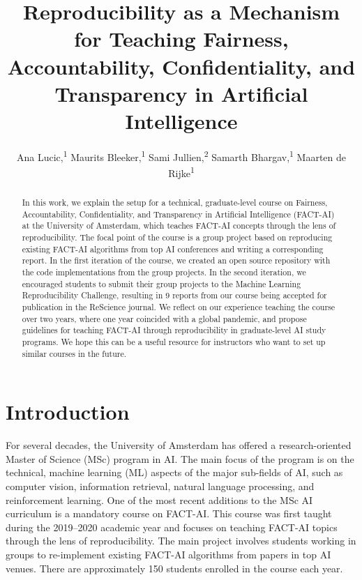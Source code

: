 \documentclass[letterpaper]{article}
\title{Reproducibility as a Mechanism for Teaching Fairness, Accountability, Confidentiality, and Transparency in Artificial Intelligence}
\author {
    Ana Lucic,\equalcontrib{}\textsuperscript{\rm 1}
    Maurits Bleeker,\equalcontrib{}\textsuperscript{\rm 1}
    Sami Jullien,\textsuperscript{\rm 2}
    Samarth Bhargav,\textsuperscript{\rm 1}
    Maarten de Rijke\textsuperscript{\rm 1}
}
\newcommand{\OurUniversity}{the University of Amsterdam}
\begin{document}
\maketitle

\begin{abstract}
In this work, we explain the setup for a technical, graduate-level course on Fairness, Accountability, Confidentiality, and Transparency in Artificial Intelligence (FACT-AI) at \OurUniversity{}, which teaches FACT-AI concepts through the lens of reproducibility. 
The focal point of the course is a group project based on reproducing existing FACT-AI algorithms from top AI conferences and writing a corresponding report. 
In the first iteration of the course, we created an open source repository with the code implementations from the group projects. 
In the second iteration, we encouraged students to submit their group projects to the Machine Learning Reproducibility Challenge, resulting in 9 reports from our course being accepted for publication in the ReScience journal. 
We reflect on our experience teaching the course over two years, where one year coincided with a global pandemic, and propose guidelines for teaching FACT-AI through reproducibility in graduate-level AI study programs. 
We hope this can be a useful resource for instructors who want to set up similar courses in the future. 
\end{abstract}





% 



\clearpage
\fi

\section{Introduction}
\label{section:introduction}

For several decades, \OurUniversity{} has offered a research-oriented Master of Science (MSc) program in \acf{AI}. 
The main focus of the program is on the technical, machine learning (ML) aspects of the major sub-fields of \ac{AI}, such as computer vision, information retrieval, natural language processing, and reinforcement learning.
One of the most recent additions to the MSc AI curriculum is a mandatory course on \ac{FACT-AI}. 
This course was first taught during the 2019--2020 academic year and focuses on teaching FACT-AI topics through the lens of reproducibility. 
The main project involves students working in groups to re-implement existing FACT-AI algorithms from papers in top AI venues. 
There are approximately 150 students enrolled in the course each year. 
\end{document}
